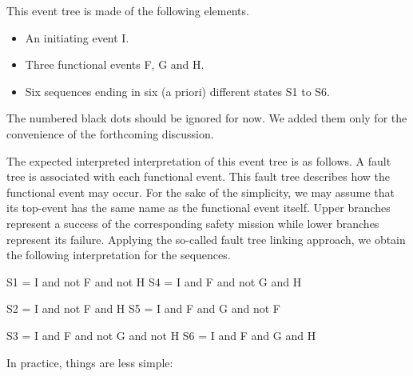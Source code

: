 \documentclass[11pt]{article}
\begin{document}
This event tree is made of the following elements.

\begin{itemize}
\item An initiating event I.

\item Three functional events F, G and H.

\item Six sequences ending in six (a priori) different states S1 to S6.
\end{itemize}

The numbered black dots should be ignored for now. We added them only
for the convenience of the forthcoming discussion.

The expected interpreted interpretation of this event tree is as
follows. A fault tree is associated with each functional event. This
fault tree describes how the functional event may occur. For the sake of
the simplicity, we may assume that its top-event has the same name as
the functional event itself. Upper branches represent a success of the
corresponding safety mission while lower branches represent its failure.
Applying the so-called fault tree linking approach, we obtain the
following interpretation for the sequences.

S1 = I and not F and not H S4 = I and F and not G and H

S2 = I and not F and H S5 = I and F and G and not F

S3 = I and F and not G and not H S6 = I and F and G and H

In practice, things are less simple:
\end{document}
